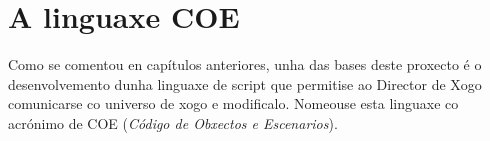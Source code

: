 \chapter{A linguaxe COE}
Como se comentou en capítulos anteriores, unha das bases deste proxecto é o
desenvolvemento dunha linguaxe de script que permitise ao Director de Xogo
comunicarse co universo de xogo e modificalo. Nomeouse esta linguaxe co acrónimo
de COE ({\it Código de Obxectos e Escenarios}).